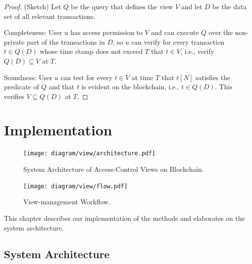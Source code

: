 \begin{proof} (Sketch)
Let $Q$ be the query that defines the view $V$ and let $D$ be the data set of all relevant transactions. 

Completeness: User $u$ has access permission to $V$ and can execute $Q$ over the non-private part of the transactions in $D$, so $u$ can verify for every transaction $t\in Q(D)$ whose time stamp does not exceed $T$ that $t\in V$, i.e., verify $Q(D)\subseteq V$ at $T$. 

Soundness: User $u$ can test for every $t\in V$ at time $T$ that $t[N]$ satisfies the predicate of $Q$ and that $t$ is evident on the blockchain, i.e., $t\in Q(D)$. This verifies $V\subseteq Q(D)$ at $T$. 
\end{proof}


\section{Implementation}
\label{ch:view:impl}


\begin{figure}[t]
    \centering
    \texttt{[image: diagram/view/architecture.pdf]}
    \caption{System Architecture of Access-Control Views on Blockchain. }
    \label{diagram:view:impl:architecture}
\end{figure}

\begin{figure}[t]
    \centering
    \texttt{[image: diagram/view/flow.pdf]}
    \caption{View-management Workflow.}
    \label{diagram:view:impl:flow}
\end{figure}
    
    
This chapter describes our implementation of the methods and elaborates on the system architecture. 



\subsection{System Architecture}
\label{ch:view:impl:overview}

